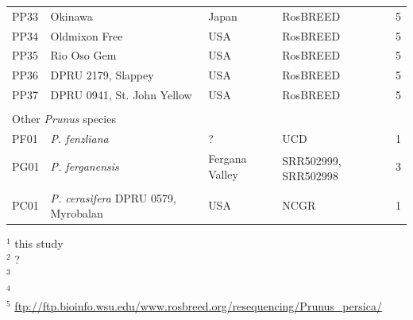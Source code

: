 \documentclass[12pt]{article}
\begin{document}
\begin{center}
\begin{longtable}{lllll}
                 PP33 &Okinawa &Japan &RosBREED &5\\
                 PP34 &Oldmixon Free &USA &RosBREED &5\\
                 PP35 &Rio Oso Gem &USA &RosBREED &5\\
                 PP36 &DPRU 2179, Slappey &USA &RosBREED &5\\
                 PP37 &DPRU 0941, St. John Yellow &USA &RosBREED &5\\
		\\
                 \multicolumn{5}{l}{Other \emph{Prunus} species}  \\
                 PF01 &\emph{P. fenzliana} &? &UCD &1\\
                 PG01 &\emph{P. ferganensis} &Fergana Valley &
		\multirow{2}{1cm}{SRR502999, SRR502998} &3\\
                 \\
                 PC01 &\emph{P. cerasifera} DPRU 0579, Myrobalan &USA &NCGR &1\\ \hline

\end{longtable}
\end{center}
$^{1}$ this study\\
$^{2}$ \citealt{koepke2013comparative}?\\
$^{3}$ \citealt{verde2013high}\\
$^{4}$ \citealt{ahmad2011whole}\\
$^{5}$ \url{ftp://ftp.bioinfo.wsu.edu/www.rosbreed.org/resequencing/Prunus_persica/}\\
\end{document}
